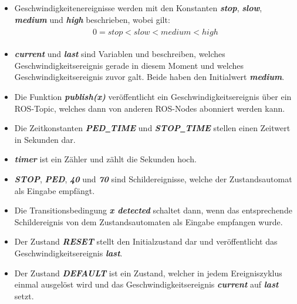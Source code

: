 \begin{itemize}
	\item Geschwindigkeitenereignisse werden mit den Konstanten \textbf{\textit{stop}}, \textbf{\textit{slow}}, \textbf{\textit{medium}} und \textbf{\textit{high}} beschrieben, wobei gilt:
	\begin{align}
	\begin{split}
	\label{vel_vergleich}
	0 = stop < slow < medium < high
	\end{split}
	\end{align}
	
	\item \textbf{\textit{current}} und \textbf{\textit{last}} sind Variablen und beschreiben, welches Geschwindigkeitsereignis gerade in diesem Moment und welches Geschwindigkeitsereignis zuvor galt. Beide haben den Initialwert \textbf{\textit{medium}}.
	
	\item Die Funktion \textbf{\textit{publish(x)}} ver\"offentlicht ein Geschwindigkeitsereignis \"uber ein ROS-Topic, welches dann von anderen ROS-Nodes abonniert werden kann.
	
	\item Die Zeitkonstanten \textbf{\textit{PED\underline{\ }TIME}} und \textbf{\textit{STOP\underline{\ }TIME}} stellen einen Zeitwert in Sekunden dar.
	
	\item \textbf{\textit{timer}} ist ein Z\"ahler und z\"ahlt die Sekunden hoch.
	
	\item \textbf{\textit{STOP}}, \textbf{\textit{PED}}, \textbf{\textit{40}} und \textbf{\textit{70}} sind Schildereignisse, welche der Zustandsautomat als Eingabe empf\"angt. 
	
	\item Die Transitionsbedingung \textbf{\textit{x detected}} schaltet dann, wenn das entsprechende Schildereignis von dem Zustandsautomaten als Eingabe empfangen wurde.
	
	\item Der Zustand \textbf{\textit{RESET}} stellt den Initialzustand dar und ver\"offentlicht das Geschwindigkeitsereignis \textbf{\textit{last}}.
	
	\item Der Zustand \textbf{\textit{DEFAULT}} ist ein Zustand, welcher in jedem Ereigniszyklus einmal ausgel\"ost wird und das Geschwindigkeitsereignis \textbf{\textit{current}} auf \textbf{\textit{last}} setzt.
	
\end{itemize}


